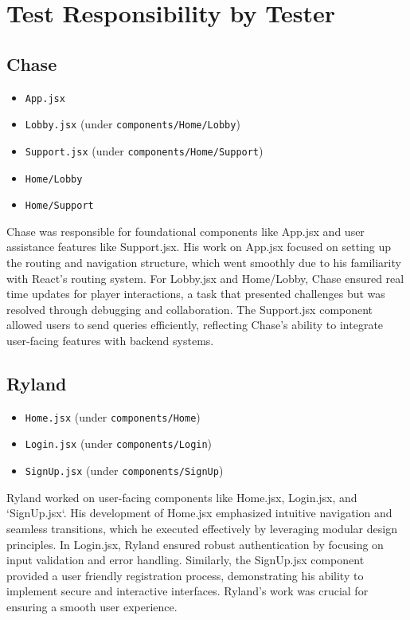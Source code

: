 \section*{Test Responsibility by Tester}

\subsection*{Chase}
\begin{itemize}
    \item \texttt{App.jsx}
    \item \texttt{Lobby.jsx} (under \texttt{components/Home/Lobby})
    \item \texttt{Support.jsx} (under \texttt{components/Home/Support})
    \item \texttt{Home/Lobby}
    \item \texttt{Home/Support}
\end{itemize}

\noindent Chase was responsible for foundational components like App.jsx and user assistance features like Support.jsx. His work on App.jsx focused on setting up the routing and navigation structure, which went smoothly due to his familiarity with React's routing system. For Lobby.jsx and Home/Lobby, Chase ensured real time updates for player interactions, a task that presented challenges but was resolved through debugging and collaboration. The Support.jsx component allowed users to send queries efficiently, reflecting Chase's ability to integrate user-facing features with backend systems.

\subsection*{Ryland}
\begin{itemize}
    \item \texttt{Home.jsx} (under \texttt{components/Home})
    \item \texttt{Login.jsx} (under \texttt{components/Login})
    \item \texttt{SignUp.jsx} (under \texttt{components/SignUp})
\end{itemize}

\noindent Ryland worked on user-facing components like Home.jsx, Login.jsx, and `SignUp.jsx`. His development of Home.jsx emphasized intuitive navigation and seamless transitions, which he executed effectively by leveraging modular design principles. In Login.jsx, Ryland ensured robust authentication by focusing on input validation and error handling. Similarly, the SignUp.jsx component provided a user friendly registration process, demonstrating his ability to implement secure and interactive interfaces. Ryland’s work was crucial for ensuring a smooth user experience.

